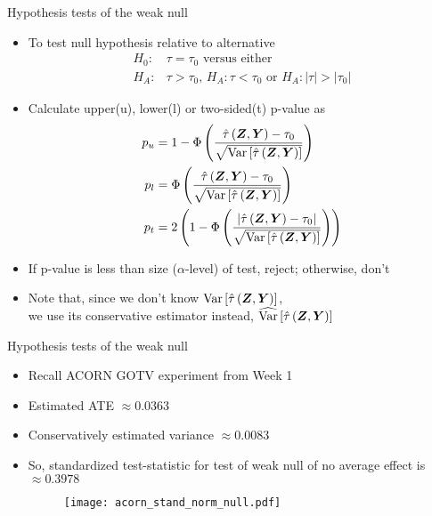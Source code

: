 \documentclass[table, xcolor = {dvipsnames}, 9pt]{beamer}
\theoremstyle{plain}
\DeclareMathOperator{\Var}{\rm{Var}}
\begin{document}
\begin{frame}{Hypothesis tests of the weak null} \vfill
\begin{itemize} \vfill
\item To test null hypothesis relative to alternative \vfill
\begin{align*}
H_0: & \tau = \tau_0 \text{ versus either } \\
H_A: & \tau > \tau_0, \, H_A: \tau < \tau_0 \text{ or } H_A: \left\lvert \tau \right\rvert > \left\lvert \tau_0 \right \rvert
\end{align*} \vfill
\item Calculate upper(u), lower(l) or two-sided(t) p-value as \vfill
\begin{align*}
p_u & =  1 - \Phi\left(\frac{\hat{\tau}\left(\bm{Z}, \bm{Y}\right) - \tau_0}{\sqrt{\Var\left[\hat{\tau}\left(\bm{Z}, \bm{Y}\right)\right]}}\right) \\
p_l & =  \Phi\left(\frac{\hat{\tau}\left(\bm{Z}, \bm{Y}\right) - \tau_0}{\sqrt{\Var\left[\hat{\tau}\left(\bm{Z}, \bm{Y}\right)\right]}}\right) \\
p_t & = 2\left(1 - \Phi\left(\frac{\left\lvert\hat{\tau}\left(\bm{Z}, \bm{Y}\right) - \tau_0\right\rvert}{\sqrt{\Var\left[\hat{\tau}\left(\bm{Z}, \bm{Y}\right)\right]}}\right)\right)
\end{align*} \vfill
\item If p-value is less than size ($\alpha$-level) of test, reject; otherwise, don't \vfill
\item Note that, since we don't know $\Var\left[\hat{\tau}\left(\bm{Z}, \bm{Y}\right)\right]$, \\ we use its conservative estimator instead, $\widehat{\Var}\left[\hat{\tau}\left(\bm{Z}, \bm{Y}\right)\right]$ \vfill
\end{itemize} \vfill
\end{frame}
\begin{frame}{Hypothesis tests of the weak null} \vfill
\begin{itemize} \vfill
\item Recall ACORN GOTV experiment \citep{arceneaux2005} from Week 1 \vfill
\item Estimated ATE $\approx 0.0363$ \vfill
\item Conservatively estimated variance $\approx 0.0083$ \vfill
\item So, standardized test-statistic for test of weak null of no average effect is $\approx 0.3978$ \vfill
\vspace{1em}
\begin{figure}
\texttt{[image: acorn\_stand\_norm\_null.pdf]}
\end{figure} \vfill
\end{itemize} \vfill
\end{frame}
\end{document}
